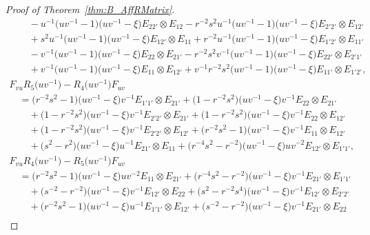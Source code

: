 \documentclass[10pt,a4paper]{amsart}
\numberwithin{equation}{section}
\begin{document}
\begin{proof}[Proof of Theorem~\ref{thm:B_AffRMatrix}]
\begin{gather*}
\qquad{}- u^{-1}\bigl(uv^{-1} - 1\bigr)\bigl(uv^{-1} - \xi\bigr)E_{22'} \otimes E_{12} -r^{-2}s^{2}u^{-1}\bigl(uv^{-1} -1\bigr)\bigl(uv^{-1} -\xi\bigr)E_{2'2'} \otimes E_{12'} \\
\qquad{}+s^{2}u^{-1}\bigl(uv^{-1} - 1\bigr)\bigl(uv^{-1} - \xi\bigr)E_{12'} \otimes E_{11} + r^{-2}u^{-1}\bigl(uv^{-1} -1\bigr)\bigl(uv^{-1} - \xi\bigr)E_{1'2'} \otimes E_{11'} \\
\qquad{}-v^{-1}\bigl(uv^{-1} - 1\bigr)\bigl(uv^{-1} - \xi\bigr)E_{22} \otimes E_{21'} - r^{-2}s^{2}v^{-1}\bigl(uv^{-1} - 1\bigr)\bigl(uv^{-1} - \xi\bigr)E_{22'} \otimes E_{2'1'} \\
\qquad{}+v^{-1}\bigl(uv^{-1} - 1\bigr)\bigl(uv^{-1} - \xi\bigr)E_{11} \otimes E_{12'} + v^{-1}r^{-2}s^{2}\bigl(uv^{-1} - 1\bigr)\bigl(uv^{-1} - \xi\bigr)E_{11'} \otimes E_{1'2'},
\\
 F_{vu}R_{5}\bigl(uv^{-1}\bigr) - R_{4}\bigl(uv^{-1}\bigr)F_{uv} \\
 \quad{}= \bigl(r^{-2}s^{2} - 1\bigr)\bigl(uv^{-1} - \xi\bigr)v^{-1}E_{1'1'} \otimes E_{21'}+ \bigl(1 - r^{-2}s^{2}\bigr)\bigl(uv^{-1} - \xi\bigr)v^{-1}E_{22} \otimes E_{21'} \\
 \qquad{}+ \bigl(1 - r^{-2}s^{2}\bigr)\bigl(uv^{-1} - \xi\bigr)v^{-1}E_{2'2'} \otimes E_{21'}+ \bigl(1 - r^{-2}s^{2}\bigr)\bigl(uv^{-1} - \xi\bigr)v^{-1}E_{22} \otimes E_{12'}
 \\
 \qquad{}+\bigl(1 - r^{-2}s^{2}\bigr)\bigl(uv^{-1} - \xi\bigr)v^{-1}E_{2'2'} \otimes E_{12'}+ \bigl(r^{-2}s^{2} - 1\bigr)\bigl(uv^{-1} - \xi\bigr)v^{-1}E_{11} \otimes E_{12'}
 \\
 \qquad{}+\bigl(s^{2} - r^{2}\bigr)\bigl(uv^{-1} - \xi\bigr)u^{-1}E_{21'} \otimes E_{11}+ \bigl(r^{-4}s^{2} - r^{-2}\bigr)\bigl(uv^{-1} - \xi\bigr)uv^{-2}E_{12'} \otimes E_{1'1'},
\\
 F_{vu}R_{4}\bigl(uv^{-1}\bigr) - R_{5}\bigl(uv^{-1}\bigr)F_{uv} \\
 \quad{}= \bigl(r^{-2}s^{2} - 1\bigr)\bigl(uv^{-1} - \xi\bigr)uv^{-2}E_{11} \otimes E_{21'} + \bigl(r^{-4}s^{2} - r^{-2}\bigr)\bigl(uv^{-1} - \xi\bigr)v^{-1}E_{21'} \otimes E_{1'1'} \\
 \qquad{}+ \bigl(s^{-2} - r^{-2}\bigr)\bigl(uv^{-1} - \xi\bigr)v^{-1}E_{12'} \otimes E_{22}+\bigl(s^{2} - r^{-2}s^{4}\bigr)\bigl(uv^{-1} - \xi\bigr)v^{-1}E_{12'} \otimes E_{2'2'} \\
 \qquad{}+ \bigl(r^{-2}s^{2} - 1\bigr)\bigl(uv^{-1} - \xi\bigr)u^{-1}E_{1'1'} \otimes E_{12'}+\bigl(s^{-2} - r^{-2}\bigr)\bigl(uv^{-1} - \xi\bigr)v^{-1}E_{21'} \otimes E_{22} \\

\end{gather*}
\end{proof}
\end{document}
